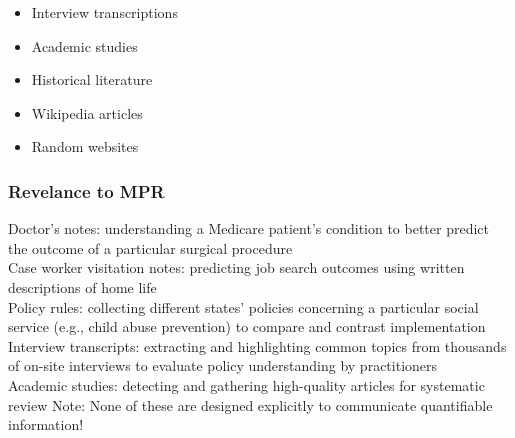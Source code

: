 \documentclass[smaller,xcolor=table,aspectratio=169]{beamer}
\begin{document}
\begin{frame}[fragile]
\begin{center}
\end{center}

\begin{itemize}
  \item Interview transcriptions
  \item Academic studies
  \item Historical literature
  \item Wikipedia articles
  \item Random websites
\end{itemize}
\end{frame}

\begin{frame}
  \frametitle{Revelance to MPR}
  Doctor's notes:  understanding a Medicare patient's condition to better predict the outcome of a particular surgical procedure\\
  Case worker visitation notes:  predicting job search outcomes using written descriptions of home life\\
  Policy rules:  collecting different states' policies concerning a particular social service (e.g., child abuse prevention) to compare and contrast implementation\\
  Interview transcripts:  extracting and highlighting common topics from thousands of on-site interviews to evaluate policy understanding by practitioners\\
  Academic studies:  detecting and gathering high-quality articles for systematic review
  \vfill{}
  Note: None of these are designed explicitly to communicate quantifiable information!
\end{frame}
\end{document}
